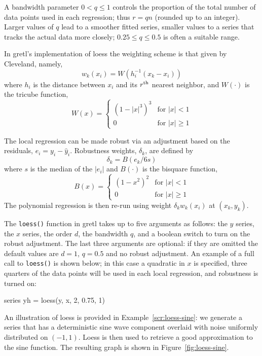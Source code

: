 A bandwidth parameter $0 < q \leq 1$ controls the proportion of the
total number of data points used in each regression; thus $r = qn$
(rounded up to an integer). Larger values of $q$ lead to a smoother
fitted series, smaller values to a series that tracks the actual data
more closely; $0.25 \leq q \leq 0.5$ is often a suitable range.

In gretl's implementation of loess the weighting scheme is
that given by Cleveland, namely,
\[
w_k(x_i) = W(h_i^{-1}(x_k - x_i))
\]
where $h_i$ is the distance between $x_i$ and its $r^{\rm th}$ nearest
neighbor, and $W(\cdot)$ is the tricube function,
\[
W(x) = \begin{cases}
 (1 - |x|^3)^3 & \mbox{for } |x| < 1 \\
  0            & \mbox{for } |x| \geq 1
\end{cases}
\]

The local regression can be made robust via an adjustment based on the
residuals, $e_i = y_i - \hat{y}_i$. Robustness weights, $\delta_k$, are
defined by
\[
\delta_k = B(e_k / 6s)
\]
where $s$ is the median of the $|e_i|$ and $B(\cdot)$ is the
bisquare function,
\[
B(x) = \begin{cases}
 (1 - x^2)^2 & \mbox{for } |x| < 1 \\
  0          & \mbox{for } |x| \geq 1
\end{cases}
\]
The polynomial regression is then re-run using weight
$\delta_kw_k(x_i)$ at $(x_k, y_k)$.

The \texttt{loess()} function in gretl takes up to five
arguments as follows: the $y$ series, the $x$ series, the order $d$,
the bandwidth $q$, and a boolean switch to turn on the robust
adjustment. The last three arguments are optional: if they are omitted
the default values are $d=1$, $q=0.5$ and no robust adjustment. An
example of a full call to \texttt{loess()} is shown below; in this
case a quadratic in $x$ is specified, three quarters of the data
points will be used in each local regression, and robustness is turned
on:
\begin{code}
series yh = loess(y, x, 2, 0.75, 1)
\end{code}

An illustration of loess is provided in Example~\ref{scr:loess-sine}:
we generate a series that has a deterministic sine wave component
overlaid with noise uniformly distributed on $(-1,1)$. Loess is then
used to retrieve a good approximation to the sine function.  The
resulting graph is shown in Figure~\ref{fig:loess-sine}.

